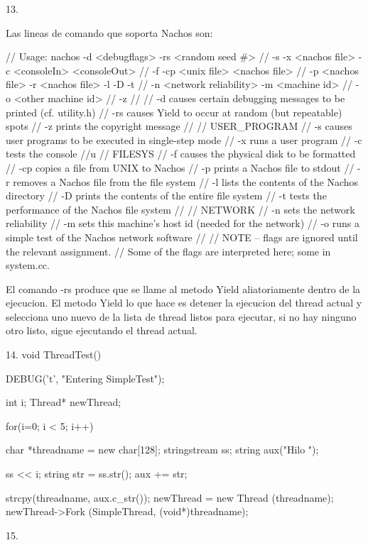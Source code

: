 \documentclass[a4paper, 11pt]{article}
\begin{document}
13.

Las lineas de comando que soporta Nachos son:

// Usage: nachos -d <debugflags> -rs <random seed #>
//		-s -x <nachos file> -c <consoleIn> <consoleOut>
//		-f -cp <unix file> <nachos file>
//		-p <nachos file> -r <nachos file> -l -D -t
//              -n <network reliability> -m <machine id>
//              -o <other machine id>
//              -z
//
//    -d causes certain debugging messages to be printed (cf. utility.h)
//    -rs causes Yield to occur at random (but repeatable) spots
//    -z prints the copyright message
//
//  USER_PROGRAM
//    -s causes user programs to be executed in single-step mode
//    -x runs a user program
//    -c tests the console
//u
//  FILESYS
//    -f causes the physical disk to be formatted
//    -cp copies a file from UNIX to Nachos
//    -p prints a Nachos file to stdout
//    -r removes a Nachos file from the file system
//    -l lists the contents of the Nachos directory
//    -D prints the contents of the entire file system 
//    -t tests the performance of the Nachos file system
//
//  NETWORK
//    -n sets the network reliability
//    -m sets this machine's host id (needed for the network)
//    -o runs a simple test of the Nachos network software
//
//  NOTE -- flags are ignored until the relevant assignment.
//  Some of the flags are interpreted here; some in system.cc.

El comando -rs produce que se llame al metodo Yield aliatoriamente dentro de la ejecucion. El metodo Yield lo que hace es detener la ejecucion del thread actual y selecciona uno nuevo de la lista de thread listos para ejecutar, si no hay ninguno otro listo, sigue ejecutando el thread actual.

14.
void
ThreadTest()
{
    DEBUG('t', "Entering SimpleTest");
    
    int i;
    Thread* newThread;

    for(i=0; i < 5; i++) {
        char *threadname = new char[128];
        stringstream ss;
        string aux("Hilo ");

        ss << i;
        string str = ss.str();
        aux += str;

        strcpy(threadname, aux.c_str());
        newThread = new Thread (threadname);
        newThread->Fork (SimpleThread, (void*)threadname);
    }
}

15.
\end{document}
